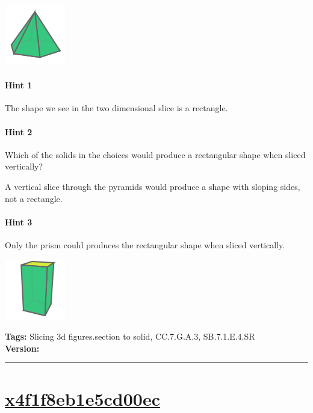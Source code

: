 \documentclass[twocolumn,10pt]{article}
\def\shrinkfactor{0.4}
\begin{document}
\includegraphics[scale=\shrinkfactor]{figures/47526769b6e12df6ce07410a61d504c7f1d84475.png}



\paragraph{Hint 1}The shape we see in the two dimensional slice is a rectangle.

\paragraph{Hint 2}Which of the solids in the choices would produce a rectangular shape when sliced vertically? 

A vertical slice through the pyramids would produce a shape with sloping sides, not a rectangle.

\DIFdelbegin {}
\DIFdelend \paragraph{Hint 3}Only the prism \DIFdelbegin {}\DIFdelend could produces the rectangular shape when sliced vertically.


\includegraphics[scale=\shrinkfactor]{figures/2ebec88f0b30eab2455be53549a16e7fc9469bd3.png}



\medskip
\noindent
\textbf{Tags:} {\footnotesize Slicing 3d figures.section to solid, CC.7.G.A.3, SB.7.1.E.4.SR}\\
\textbf{Version:} \DIFdelbegin {}\DIFdelend \DIFaddbegin {}\DIFaddend \smallskip\hrule





\section{\href{https://www.khanacademy.org/devadmin/content/items/x4f1f8eb1e5cd00ec}{x4f1f8eb1e5cd00ec}}
\end{document}
